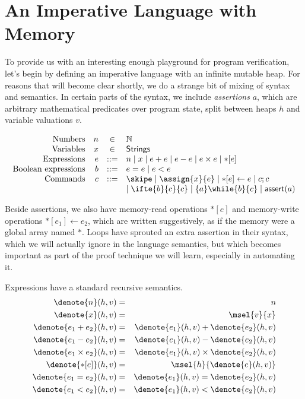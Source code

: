 \documentclass{amsbook}
\theoremstyle{definition}
\theoremstyle{remark}
\numberwithin{section}{chapter}
\numberwithin{equation}{chapter}
\begin{document}
\section{An Imperative Language with Memory}

\newcommand{\assert}[1]{\mathsf{assert}(#1)}
\newcommand{\readfrom}[1]{{*}[#1]}
\newcommand{\writeto}[2]{\readfrom{#1} \leftarrow #2}

To provide us with an interesting enough playground for program verification, let's begin by defining an imperative language with an infinite mutable heap.
For reasons that will become clear shortly, we do a strange bit of mixing of syntax and semantics.
In certain parts of the syntax, we include \emph{assertions} $a$, which are arbitrary mathematical predicates over program state, split between heaps $h$ and variable valuations $v$.

$$\begin{array}{rrcl}
  \textrm{Numbers} & n &\in& \mathbb N \\
  \textrm{Variables} & x &\in& \mathsf{Strings} \\
  \textrm{Expressions} & e &::=& n \mid x \mid e + e \mid e - e \mid e \times e \mid \readfrom{e} \\
  \textrm{Boolean expressions} & b &::=& e = e \mid e < e \\
  \textrm{Commands} & c &::=& \skipe \mid \assign{x}{e} \mid \writeto{e}{e} \mid c; c \\
  &&& \mid \ifte{b}{c}{c} \mid \{a\}\while{b}{c} \mid \assert{a}
\end{array}$$

Beside assertions, we also have memory-read operations $\readfrom{e}$ and memory-write operations $\writeto{e_1}{e_2}$, which are written suggestively, as if the memory were a global array named $*$.
Loops have sprouted an extra assertion in their syntax, which we will actually ignore in the language semantics, but which becomes important as part of the proof technique we will learn, especially in automating it.

Expressions have a standard recursive semantics.
\begin{eqnarray*}
  \denote{n}(h, v) &=& n \\
  \denote{x}(h, v) &=& \msel{v}{x} \\
  \denote{e_1 + e_2}(h, v) &=& \denote{e_1}(h, v) + \denote{e_2}(h, v) \\
  \denote{e_1 - e_2}(h, v) &=& \denote{e_1}(h, v) - \denote{e_2}(h, v) \\
  \denote{e_1 \times e_2}(h, v) &=& \denote{e_1}(h, v) \times \denote{e_2}(h, v) \\
  \denote{\readfrom{e}}(h, v) &=& \msel{h}{\denote{e}(h, v)} \\
  \denote{e_1 = e_2}(h, v) &=& \denote{e_1}(h, v) = \denote{e_2}(h, v) \\
  \denote{e_1 < e_2}(h, v) &=& \denote{e_1}(h, v) < \denote{e_2}(h, v)
\end{eqnarray*}
\end{document}
